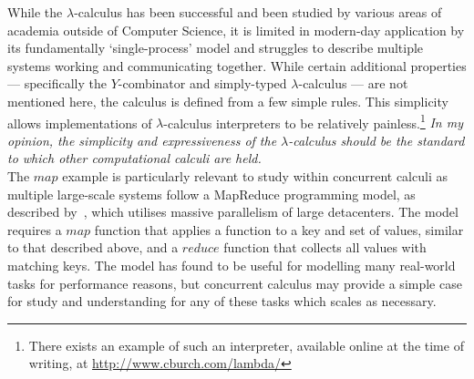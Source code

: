     
    \begin{remarks}
        While the $\lambda$-calculus has been successful and been studied by various areas of academia outside of Computer Science, it is limited in modern-day application by its fundamentally `single-process' model and struggles to describe multiple systems working and communicating together. 
        While certain additional properties --- specifically the $Y$-combinator and simply-typed $\lambda$-calculus --- are not mentioned here, the calculus is defined from a few simple rules.
        This simplicity allows implementations of $\lambda$-calculus interpreters to be relatively painless.\footnote{There exists an example of such an interpreter, available online at the time of writing, at \url{http://www.cburch.com/lambda/}}
        \textit{In my opinion, the simplicity and expressiveness of the $\lambda$-calculus should be the standard to which other computational calculi are held.}\\

        The ${map}$ example is particularly relevant to study within concurrent calculi as multiple large-scale systems follow a MapReduce programming model, as described by~\cite{mapreduce}, which utilises massive parallelism of large detacenters.
        The model requires a ${map}$ function that applies a function to a key and set of values, similar to that described above, and a ${reduce}$ function that collects all values with matching keys.
        The model has found to be useful for modelling many real-world tasks for performance reasons, but concurrent calculus may provide a simple case for study and understanding for any of these tasks which scales as necessary.

    \end{remarks}

